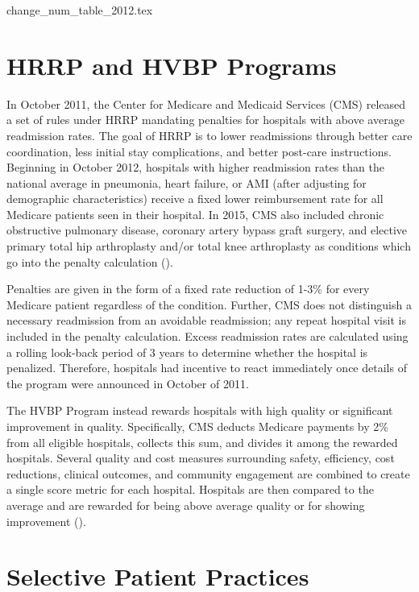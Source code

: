 \documentclass[12pt]{article}
\begin{document}
{change_num_table_2012.tex}

\section{HRRP and HVBP Programs}\label{app:programs}

In October 2011, the Center for Medicare and Medicaid Services (CMS) released a set of rules under HRRP mandating penalties for hospitals with above average readmission rates. The goal of HRRP is to lower readmissions through better care coordination, less initial stay complications, and better post-care instructions. Beginning in October 2012, hospitals with higher readmission rates than the national average in pneumonia, heart failure, or AMI (after adjusting for demographic characteristics) receive a fixed lower reimbursement rate for all Medicare patients seen in their hospital. In 2015, CMS also included chronic obstructive pulmonary disease, coronary artery bypass graft surgery, and elective primary total hip arthroplasty and/or total knee arthroplasty as conditions which go into the penalty calculation (\cite{CMS}). 
    
    Penalties are given in the form of a fixed rate reduction of 1-3\% for every Medicare patient regardless of the condition. Further, CMS does not distinguish a necessary readmission from an avoidable readmission; any repeat hospital visit is included in the penalty calculation. Excess readmission rates are calculated using a rolling look-back period of 3 years to determine whether the hospital is penalized. Therefore, hospitals had incentive to react immediately once details of the program were announced in October of 2011. 

    The HVBP Program instead rewards hospitals with high quality or significant improvement in quality. Specifically, CMS deducts Medicare payments by 2\% from all eligible hospitals, collects this sum, and divides it among the rewarded hospitals. Several quality and cost measures surrounding safety, efficiency, cost reductions, clinical outcomes, and community engagement are combined to create a single score metric for each hospital. Hospitals are then compared to the average and are rewarded for being above average quality or for showing improvement (\cite{CMS_2023}). 



    \section{Selective Patient Practices}\label{app:casemix}
\end{document}
